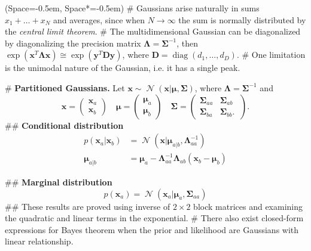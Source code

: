 \documentclass[12pt, a4paper]{article}
\newcommand{\listSpace}{-0.5em}%
\newcommand{\vect}[1]{\bm{#1}}
\DeclareMathOperator{\N}{\mathcal{N}}
\begin{document}
\begin{easylist}[itemize]
	\ListProperties(Space=\listSpace, Space*=\listSpace)
	# Gaussians arise naturally in sums $x_1 + \dots + x_N$ and averages, since when $N \to \infty$ the sum is normally distributed by the \emph{central limit theorem}.
	# The multidimensional Gaussian can be diagonalized by diagonalizing
	the precision matrix $\vect{\Lambda} = \vect{\Sigma}^{-1}$, then $\exp(\vect{x}^T \vect{\Lambda} \vect{x}) \cong \exp(\vect{y}^T \vect{D} \vect{y})$, where $\vect{D} = \operatorname{diag}(d_1, \dots, d_D)$.
	# One limitation is the unimodal nature of the Gaussian, i.e. it has a single peak.
	
	# \textbf{Partitioned Gaussians.}
	Let $\vect{x} \sim \N (\vect{x} | \vect{\mu}, \vect{\Sigma})$, where $\vect{\Lambda} = \vect{\Sigma}^{-1}$ 
	and 
	\begin{equation*}
	\vect{x} =
	\begin{pmatrix}
	\vect{x}_a \\ 
	\vect{x}_b 
	\end{pmatrix}
	\quad 
	\vect{\mu} =
	\begin{pmatrix}
	\vect{\mu}_a \\ 
	\vect{\mu}_b 
	\end{pmatrix}
	\quad 
	\vect{\Sigma} =
	\begin{pmatrix}
	\vect{\Sigma}_{aa} & \vect{\Sigma}_{ab}  \\ 
	\vect{\Sigma}_{ba} & \vect{\Sigma}_{bb}.\
	\end{pmatrix}.
	\end{equation*}
	## \textbf{Conditional distribution}
	\begin{align*} 
	p(\vect{x}_a |\vect{x}_b )
	&= \N (\vect{x} | \vect{\mu}_{a | b}, \vect{\Lambda}_{aa}^{-1}) \\
	\vect{\mu}_{a | b} &= 
	\vect{\mu}_{a} - \vect{\Lambda}_{aa}^{-1} \vect{\Lambda}_{ab} (\vect{x}_b - \vect{\mu}_b)
	\end{align*}
	
	## \textbf{Marginal distribution}
	\begin{equation*} 
	p(\vect{x}_a  )
	= \N (\vect{x}_a | \vect{\mu}_{a}, \vect{\Sigma}_{aa})
	\end{equation*}
	## These results are proved using inverse of $2 \times 2$ block matrices and examining the quadratic and linear terms in the exponential.
	# There also exist closed-form expressions for Bayes theorem when the prior and likelihood are Gaussians with linear relationship.
\end{easylist}
\end{document}
